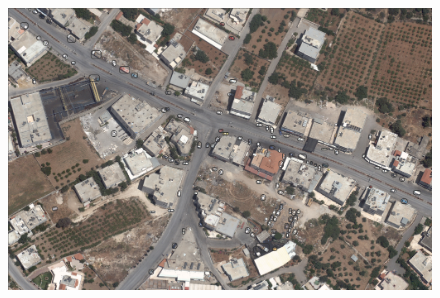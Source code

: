 \documentclass[]{article}
\begin{document}
\begin{figure}[!h]
\centering
\includegraphics[width=1\linewidth]{"images/im3"}
\end{figure}

\clearpage
\end{document}
